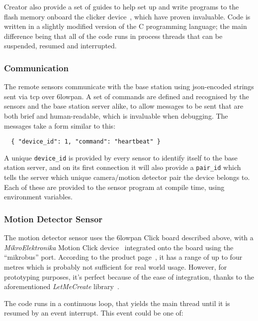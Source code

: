 Creator also provide a set of guides to help set up and write programs to the
flash memory onboard the clicker device~\cite{clickersetupguide}, which have
proven invaluable. Code is written in a slightly modified version of the C
programming language; the main difference being that all of the code runs in
process threads that can be suspended, resumed and interrupted.

\subsubsection{Communication}
The remote sensors communicate with the base station using
\acrshort{json}-encoded strings sent via \acrshort{tcp} over \gls{6lowpan}. A
set of commands are defined and recognised by the sensors and the base
station server alike, to allow messages to be sent that are both brief and
human-readable, which is invaluable when debugging. The messages take a form similar to this:

\begin{verbatim}
  { "device_id": 1, "command": "heartbeat" }
\end{verbatim}

A unique \texttt{device\_id} is provided by every sensor to identify itself
to the base station server, and on its first connection it will also provide
a \texttt{pair\_id} which tells the server which unique camera/motion
detector pair the device belongs to. Each of these are provided to the sensor
program at compile time, using environment variables.~

\subsubsection{Motion Detector Sensor}
The motion detector sensor uses the \gls{6lowpan} Click board described
above, with a \textit{MikroElektronika} Motion Click
device~\cite{motionclick} integrated onto the board using the
``\gls{mikrobus}'' port. According to the product page~\cite{motionclick}, it
has a range of up to four metres which is probably not sufficient for real
world usage. However, for prototyping purposes, it's perfect because of the
ease of integration, thanks to the aforementioned \textit{LetMeCreate}
library~\cite{letmecreate}.

The code runs in a continuous loop, that yields the main thread until it is
resumed by an event interrupt. This event could be one of:

